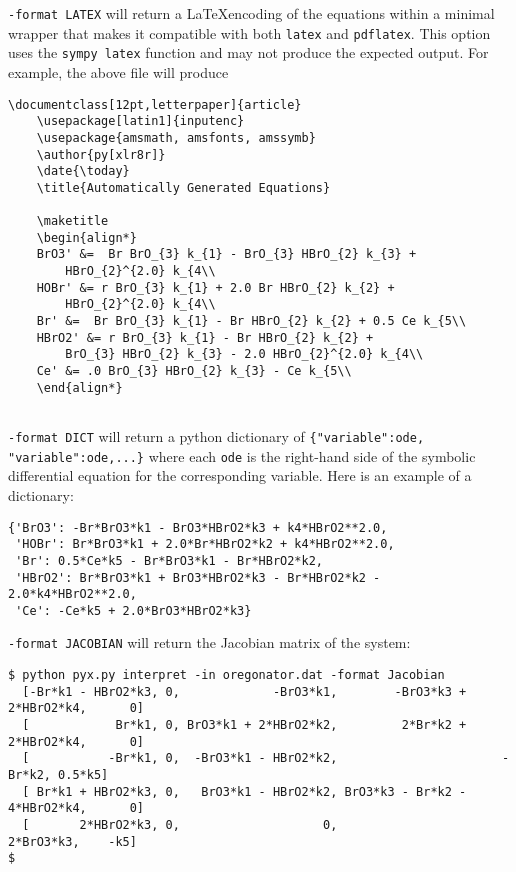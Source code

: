 {\tt -format LATEX} will return a \LaTeX encoding of the equations within a minimal wrapper that makes it compatible with both {\tt latex} and {\tt pdflatex}. 
This option uses the {\tt sympy latex} function and may not produce the expected output. 
For example, the above file will produce

\begin{Verbatim}[frame=single]
	\documentclass[12pt,letterpaper]{article}
	\usepackage[latin1]{inputenc}
	\usepackage{amsmath, amsfonts, amssymb}
	\author{py[xlr8r]}
	\date{\today}
	\title{Automatically Generated Equations}
	
	\maketitle
	\begin{align*}
	BrO3' &=  Br BrO_{3} k_{1} - BrO_{3} HBrO_{2} k_{3} + 
		HBrO_{2}^{2.0} k_{4\\
	HOBr' &= r BrO_{3} k_{1} + 2.0 Br HBrO_{2} k_{2} + 
		HBrO_{2}^{2.0} k_{4\\
	Br' &=  Br BrO_{3} k_{1} - Br HBrO_{2} k_{2} + 0.5 Ce k_{5\\
	HBrO2' &= r BrO_{3} k_{1} - Br HBrO_{2} k_{2} + 
		BrO_{3} HBrO_{2} k_{3} - 2.0 HBrO_{2}^{2.0} k_{4\\
	Ce' &= .0 BrO_{3} HBrO_{2} k_{3} - Ce k_{5\\
	\end{align*}
	
\end{Verbatim}

{\tt -format DICT} will return a python dictionary of \verb!{"variable":ode, "variable":ode,...}! where each {\tt ode} is the right-hand side of the symbolic differential equation for the corresponding variable. Here is an example of a dictionary: 
\begin{Verbatim}[frame=single]
{'BrO3': -Br*BrO3*k1 - BrO3*HBrO2*k3 + k4*HBrO2**2.0, 
 'HOBr': Br*BrO3*k1 + 2.0*Br*HBrO2*k2 + k4*HBrO2**2.0, 
 'Br': 0.5*Ce*k5 - Br*BrO3*k1 - Br*HBrO2*k2, 
 'HBrO2': Br*BrO3*k1 + BrO3*HBrO2*k3 - Br*HBrO2*k2 - 2.0*k4*HBrO2**2.0, 
 'Ce': -Ce*k5 + 2.0*BrO3*HBrO2*k3}
\end{Verbatim}


{\tt -format JACOBIAN} will return the Jacobian matrix of the system: 

\begin{footnotesize}
\begin{Verbatim}[frame=single]
$ python pyx.py interpret -in oregonator.dat -format Jacobian
  [-Br*k1 - HBrO2*k3, 0,             -BrO3*k1,        -BrO3*k3 + 2*HBrO2*k4,      0]
  [            Br*k1, 0, BrO3*k1 + 2*HBrO2*k2,         2*Br*k2 + 2*HBrO2*k4,      0]
  [           -Br*k1, 0,  -BrO3*k1 - HBrO2*k2,                       -Br*k2, 0.5*k5]
  [ Br*k1 + HBrO2*k3, 0,   BrO3*k1 - HBrO2*k2, BrO3*k3 - Br*k2 - 4*HBrO2*k4,      0]
  [       2*HBrO2*k3, 0,                    0,                    2*BrO3*k3,    -k5]
$ 
\end{Verbatim}
\end{footnotesize}


